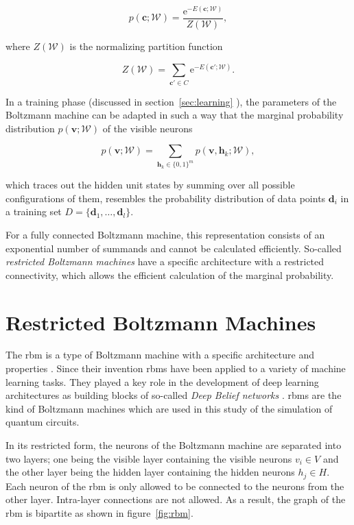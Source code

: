 \begin{equation}
   p(\bm{c};\mathcal{W}) = \frac{\mathrm{e}^{-E(\bm{c};\mathcal{W})}}{Z(\mathcal{W})},
\end{equation}

where $Z(\mathcal{W})$ is the normalizing partition function 

\begin{equation}
   Z(\mathcal{W}) = \sum_{\bm{c}\prime\in C} \mathrm{e}^{-E(\bm{c}\prime;\mathcal{W})}.
\end{equation}

In a training phase (discussed in section~\ref{sec:learning} ), the parameters of the Boltzmann machine can be adapted in such a way that 
the marginal probability distribution $p(\bm{v}; \mathcal{W})$ of the visible neurons

\begin{equation}
    \label{eq:gbm}
   p(\bm{v};\mathcal{W}) = \sum_{\bm{h}_k \in \{0,1\}^m} p(\bm{v},\bm{h}_k;\mathcal{W}),
\end{equation}

which traces out the hidden unit 
states by summing over all possible configurations of them, resembles the probability 
distribution of data points $\bm{d}_i$ in a training set $D=\{\bm{d}_1,\dots,\bm{d}_l\}$.

For a fully connected Boltzmann machine, this representation consists of an exponential number of summands and cannot be calculated efficiently. So-called \textit{restricted Boltzmann machines}
have a specific architecture with a restricted connectivity, which allows the efficient calculation of the marginal probability.

\section{Restricted Boltzmann Machines}
\label{sec:rbms}
The \gls{rbm} is a type of Boltzmann machine with 
a specific architecture and properties \cite{smolensky1986information}. Since their invention \gls{rbm}s have been applied to a variety 
of machine learning tasks. They played a 
key role in the development of deep learning architectures as building blocks of so-called 
\textit{Deep Belief networks} \cite{bengio2009learning, hinton2006fast}.
\gls{rbm}s are the kind of Boltzmann machines which are used in this study of the simulation 
of quantum circuits.

In its restricted form, the neurons of the Boltzmann machine are separated into two layers;
one being the visible layer containing the visible neurons $v_i \in V$ and the other layer being the hidden layer containing the hidden neurons $h_j \in H$. Each neuron of the \gls{rbm} 
is only allowed to be connected to the neurons from the other layer. Intra-layer connections are not allowed. As a result, the graph of the \gls{rbm} is bipartite as shown in figure~\ref{fig:rbm}. 


